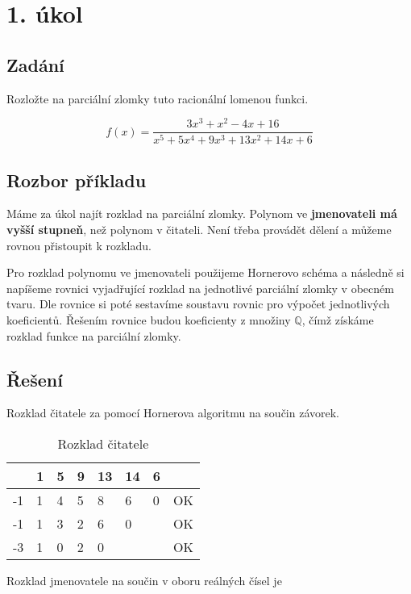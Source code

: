\section{1. úkol}

\subsection{Zadání}
Rozložte na parciální zlomky tuto racionální lomenou funkci.

\begin{displaymath}
f(x)=\frac{3x^3+x^2-4x+16}{x^5+5x^4+9x^3+13x^2+14x+6}
\end{displaymath}

\subsection{Rozbor příkladu}
Máme za úkol najít rozklad na parciální zlomky. Polynom ve \textbf{jmenovateli má vyšší stupneň}, než polynom v čitateli. Není třeba provádět dělení a můžeme rovnou přistoupit k rozkladu.

Pro rozklad polynomu ve jmenovateli použijeme Hornerovo schéma a následně si napíšeme rovnici vyjadřující rozklad na jednotlivé parciální zlomky v obecném tvaru. Dle rovnice si poté sestavíme soustavu rovnic pro výpočet jednotlivých koeficientů. Řešením rovnice budou koeficienty z množiny $\mathbb{Q}$, čímž získáme rozklad funkce na parciální zlomky.

\subsection{Řešení}

Rozklad čitatele za pomocí Hornerova algoritmu na součin závorek.

\begin{table}[htb]
\centering
\begin{tabular}{l||l|l|l|l|l|l|l}
	 & 1 & 5 & 9 & 13 & 14 & 6 &    \\ \hline\hline
  -1 & 1 & 4 & 5 & 8  & 6  & 0 & OK \\ \hline
  -1 & 1 & 3 & 2 & 6  & 0  &   & OK \\ \hline
  -3 & 1 & 0 & 2 & 0  &    &   & OK \\
\end{tabular}
\caption{Rozklad čitatele}
\end{table}

Rozklad jmenovatele na součin v oboru reálných čísel je

